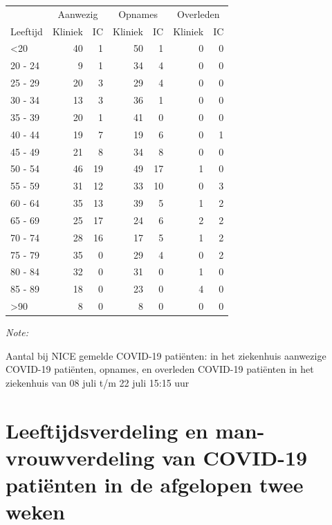 \documentclass[
  english,
  man,floatsintext]{apa6}
\begin{document}
\begin{table}
\centering\begingroup\fontsize{10}{12}\selectfont

\begin{threeparttable}
\begin{tabular}{lrrrrrr}
\toprule
\multicolumn{1}{c}{ } & \multicolumn{2}{c}{Aanwezig} & \multicolumn{2}{c}{Opnames} & \multicolumn{2}{c}{Overleden} \\
\cmidrule(l{3pt}r{3pt}){2-3} \cmidrule(l{3pt}r{3pt}){4-5} \cmidrule(l{3pt}r{3pt}){6-7}
Leeftijd & Kliniek & IC & Kliniek & IC & Kliniek & IC\\
\midrule
<20 & 40 & 1 & 50 & 1 & 0 & 0\\
20 - 24 & 9 & 1 & 34 & 4 & 0 & 0\\
25 - 29 & 20 & 3 & 29 & 4 & 0 & 0\\
30 - 34 & 13 & 3 & 36 & 1 & 0 & 0\\
35 - 39 & 20 & 1 & 41 & 0 & 0 & 0\\
40 - 44 & 19 & 7 & 19 & 6 & 0 & 1\\
45 - 49 & 21 & 8 & 34 & 8 & 0 & 0\\
50 - 54 & 46 & 19 & 49 & 17 & 1 & 0\\
55 - 59 & 31 & 12 & 33 & 10 & 0 & 3\\
60 - 64 & 35 & 13 & 39 & 5 & 1 & 2\\
65 - 69 & 25 & 17 & 24 & 6 & 2 & 2\\
70 - 74 & 28 & 16 & 17 & 5 & 1 & 2\\
75 - 79 & 35 & 0 & 29 & 4 & 0 & 2\\
80 - 84 & 32 & 0 & 31 & 0 & 1 & 0\\
85 - 89 & 18 & 0 & 23 & 0 & 4 & 0\\
>90 & 8 & 0 & 8 & 0 & 0 & 0\\
\bottomrule
\end{tabular}
\begin{tablenotes}
\item \textit{Note: } 
\item Aantal bij NICE gemelde COVID-19 patiënten: in het ziekenhuis aanwezige COVID-19 patiënten, opnames, en overleden COVID-19 patiënten in het ziekenhuis van 08 juli t/m 22 juli 15:15 uur
\end{tablenotes}
\end{threeparttable}
\endgroup{}
\end{table}

\newpage

\hypertarget{leeftijdsverdeling-en-man-vrouwverdeling-van-covid-19-patiuxebnten-in-de-afgelopen-twee-weken}{%
\section{Leeftijdsverdeling en man-vrouwverdeling van COVID-19 patiënten in de afgelopen twee weken}\label{leeftijdsverdeling-en-man-vrouwverdeling-van-covid-19-patiuxebnten-in-de-afgelopen-twee-weken}}
\end{document}
